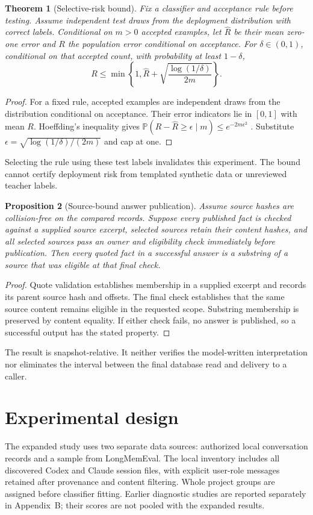 \documentclass[11pt]{article}
\newtheorem{theorem}{Theorem}
\newtheorem{proposition}[theorem]{Proposition}
\newcommand{\Prob}{\mathbb{P}}
\begin{document}
\begin{theorem}[Selective-risk bound]
Fix a classifier and acceptance rule before testing. Assume independent test draws from the deployment distribution with correct labels. Conditional on $m>0$ accepted examples, let $\widehat R$ be their mean zero-one error and $R$ the population error conditional on acceptance. For $\delta\in(0,1)$, conditional on that accepted count, with probability at least $1-\delta$,
\[
 R\leq\min\left\{1,\widehat R+
 \sqrt{\frac{\log(1/\delta)}{2m}}\right\}.
\]
\end{theorem}
\begin{proof}
For a fixed rule, accepted examples are independent draws from the distribution conditional on acceptance. Their error indicators lie in $[0,1]$ with mean $R$. Hoeffding's inequality gives
$\Prob(R-\widehat R\geq\epsilon\mid m)\leq e^{-2m\epsilon^2}$ \citep{hoeffding}.
Substitute $\epsilon=\sqrt{\log(1/\delta)/(2m)}$ and cap at one.
\end{proof}
Selecting the rule using these test labels invalidates this experiment. The bound cannot certify deployment risk from templated synthetic data or unreviewed teacher labels.

\begin{proposition}[Source-bound answer publication]
Assume source hashes are collision-free on the compared records. Suppose every published fact is checked against a supplied source excerpt, selected sources retain their content hashes, and all selected sources pass an owner and eligibility check immediately before publication. Then every quoted fact in a successful answer is a substring of a source that was eligible at that final check.
\end{proposition}
\begin{proof}
Quote validation establishes membership in a supplied excerpt and records its parent source hash and offsets. The final check establishes that the same source content remains eligible in the requested scope. Substring membership is preserved by content equality. If either check fails, no answer is published, so a successful output has the stated property.
\end{proof}
The result is snapshot-relative. It neither verifies the model-written interpretation nor eliminates the interval between the final database read and delivery to a caller.

\section{Experimental design}
The expanded study uses two separate data sources: authorized local conversation records and a sample from LongMemEval. The local inventory includes all discovered Codex and Claude session files, with explicit user-role messages retained after provenance and content filtering. Whole project groups are assigned before classifier fitting. Earlier diagnostic studies are reported separately in Appendix~B; their scores are not pooled with the expanded results.
\end{document}
